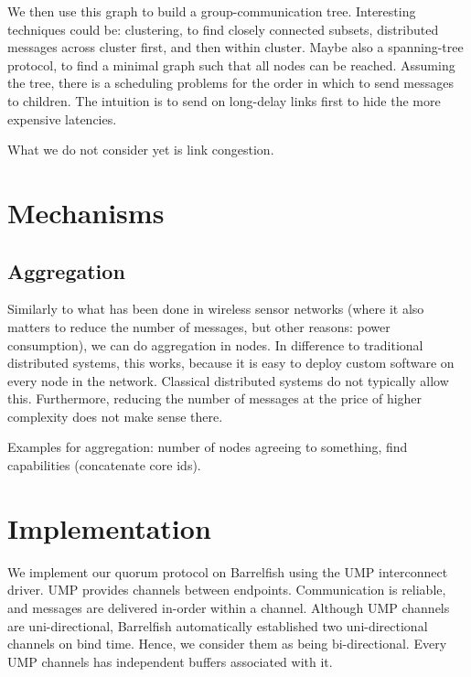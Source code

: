 \documentclass{article}
\begin{document}
We then use this graph to build a group-communication
tree. Interesting techniques could be: clustering, to find closely
connected subsets, distributed messages across cluster first, and then
within cluster. Maybe also a spanning-tree protocol, to find a minimal
graph such that all nodes can be reached.
Assuming the tree, there is a scheduling problems for the order in
which to send messages to children. The intuition is to send on
long-delay links first to hide the more expensive latencies.

What we do not consider yet is link congestion. 

\section{Mechanisms}

\subsection{Aggregation}

Similarly to what has been done in wireless sensor networks (where it
also matters to reduce the number of messages, but other reasons:
power consumption), we can do aggregation in nodes. In difference to
traditional distributed systems, this works, because it is easy to
deploy custom software on every node in the network. Classical
distributed systems do not typically allow this. Furthermore, reducing
the number of messages at the price of higher complexity does not make
sense there.

Examples for aggregation: number of nodes agreeing to something, find
capabilities (concatenate core ids). 

\section{Implementation}

We implement our quorum protocol on Barrelfish using the UMP
interconnect driver. UMP provides channels between
endpoints. Communication is reliable, and messages are delivered
in-order within a channel. Although UMP channels are uni-directional,
Barrelfish automatically established two uni-directional channels on
bind time. Hence, we consider them as being bi-directional. Every UMP
channels has independent buffers associated with it.
\end{document}
